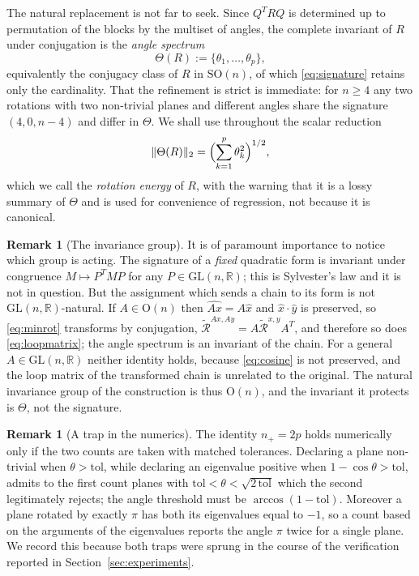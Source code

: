 \documentclass[11pt,a4paper]{article}
\theoremstyle{plain}
\theoremstyle{definition}
\newtheorem{remark}[theorem]{Remark}
\numberwithin{equation}{section}
\newcommand{\R}{\mathbb{R}}
\newcommand{\SO}{\mathrm{SO}}
\newcommand{\Ort}{\mathrm{O}}
\newcommand{\Rmin}{\widetilde{\mathcal{R}}}
\begin{document}
The natural replacement is not far to seek. Since $Q^T R Q$ is
determined up to permutation of the blocks by the multiset of angles,
the complete invariant of $R$ under conjugation is the \emph{angle
spectrum}
\begin{equation}\label{eq:anglespectrum}
\Theta(R) := \{\theta_1,\dots,\theta_p\},
\end{equation}
equivalently the conjugacy class of $R$ in $\SO(n)$, of which
\eqref{eq:signature} retains only the cardinality. That the refinement
is strict is immediate: for $n \ge 4$ any two rotations with two
non-trivial planes and different angles share the signature
$(4,0,n-4)$ and differ in $\Theta$. We shall use throughout the scalar
reduction
\begin{equation}\label{eq:energy}
\|\Theta(R)\|_2 = \Bigl(\sum_{k=1}^{p}\theta_k^2\Bigr)^{1/2},
\end{equation}
which we call the \emph{rotation energy} of $R$, with the warning that
it is a lossy summary of $\Theta$ and is used for convenience of
regression, not because it is canonical.

\begin{remark}[The invariance group]\label{rem:group}
It is of paramount importance to notice which group is acting. The
signature of a \emph{fixed} quadratic form is invariant under congruence
$M \mapsto P^T M P$ for any $P \in \mathrm{GL}(n,\R)$; this is
Sylvester's law and it is not in question. But the assignment which
sends a chain to its form is not $\mathrm{GL}(n,\R)$-natural. If
$A \in \Ort(n)$ then $\widehat{Ax} = A\hat{x}$ and
$\hat{x}\cdot\hat{y}$ is preserved, so \eqref{eq:minrot} transforms by
conjugation, $\Rmin^{Ax,Ay} = A \Rmin^{x,y} A^T$, and therefore so does
\eqref{eq:loopmatrix}; the angle spectrum is an invariant of the chain.
For a general $A \in \mathrm{GL}(n,\R)$ neither identity holds, because
\eqref{eq:cosine} is not preserved, and the loop matrix of the
transformed chain is unrelated to the original. The natural invariance
group of the construction is thus $\Ort(n)$, and the invariant it
protects is $\Theta$, not the signature.
\end{remark}

\begin{remark}[A trap in the numerics]\label{rem:tolerance}
The identity $n_+ = 2p$ holds numerically only if the two counts are
taken with matched tolerances. Declaring a plane non-trivial when
$\theta > \mathrm{tol}$, while declaring an eigenvalue positive when
$1-\cos\theta > \mathrm{tol}$, admits to the first count planes with
$\mathrm{tol} < \theta < \sqrt{2\,\mathrm{tol}}$ which the second
legitimately rejects; the angle threshold must be
$\arccos(1-\mathrm{tol})$. Moreover a plane rotated by exactly $\pi$ has
both its eigenvalues equal to $-1$, so a count based on the arguments of
the eigenvalues reports the angle $\pi$ twice for a single plane. We
record this because both traps were sprung in the course of the
verification reported in Section~\ref{sec:experiments}.
\end{remark}
\end{document}
